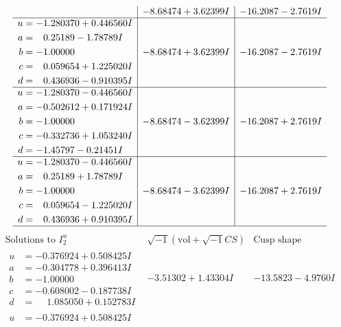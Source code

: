 \documentclass[1p]{elsarticle_modified}
\theoremstyle{definition}
\newcommand{\I}{\sqrt{-1}}
\begin{document}
$$\begin{array}{c|c|c}
 & -8.68474 + 3.62399 I & -16.2087 - 2.7619 I \\ \hline\begin{aligned}
u &= -1.280370 + 0.446560 I \\
a &= \phantom{-}0.25189 - 1.78789 I \\
b &= -1.00000\phantom{ +0.000000I} \\
c &= \phantom{-}0.059654 + 1.225020 I \\
d &= \phantom{-}0.436936 - 0.910395 I\end{aligned}
 & -8.68474 + 3.62399 I & -16.2087 - 2.7619 I \\ \hline\begin{aligned}
u &= -1.280370 - 0.446560 I \\
a &= -0.502612 + 0.171924 I \\
b &= -1.00000\phantom{ +0.000000I} \\
c &= -0.332736 + 1.053240 I \\
d &= -1.45797 - 0.21451 I\end{aligned}
 & -8.68474 - 3.62399 I & -16.2087 + 2.7619 I \\ \hline\begin{aligned}
u &= -1.280370 - 0.446560 I \\
a &= \phantom{-}0.25189 + 1.78789 I \\
b &= -1.00000\phantom{ +0.000000I} \\
c &= \phantom{-}0.059654 - 1.225020 I \\
d &= \phantom{-}0.436936 + 0.910395 I\end{aligned}
 & -8.68474 - 3.62399 I & -16.2087 + 2.7619 I\\
 \hline 
 \end{array}$$\newpage$$\begin{array}{c|c|c}  
\text{Solutions to }I^u_{2}& \I (\text{vol} + \sqrt{-1}CS) & \text{Cusp shape}\\
 \hline 
\begin{aligned}
u &= -0.376924 + 0.508425 I \\
a &= -0.304778 + 0.396413 I \\
b &= -1.00000\phantom{ +0.000000I} \\
c &= -0.608002 - 0.187738 I \\
d &= \phantom{-}1.085050 + 0.152783 I\end{aligned}
 & -3.51302 + 1.43304 I & -13.5823 - 4.9760 I \\ \hline\begin{aligned}
u &= -0.376924 + 0.508425 I \\

\end{aligned}
\end{array}$$
\end{document}
